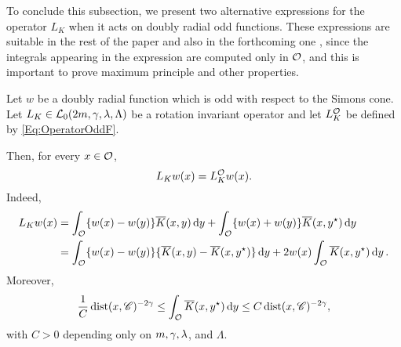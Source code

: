 To conclude this subsection, we present two alternative expressions for the operator $L_K$ when it acts on doubly radial odd functions. These expressions are suitable in the rest of the paper and also in the forthcoming one \cite{FelipeSanz-Perela:IntegroDifferentialII}, since the integrals appearing in the expression are computed only in $\mathcal{O}$, and this is important to prove maximum principle and other properties.

\begin{lemma}
	\label{Lemma:OperatorOddF}
	Let $w$ be a doubly radial function which is odd with respect to the Simons cone. Let $L_K \in \mathcal{L}_0(2m,\gamma,\lambda, \Lambda)$ be a rotation invariant operator and let $L_K^{\mathcal{O}}$ be defined by \eqref{Eq:OperatorOddF}. 
	
	Then, for every $x\in\mathcal{O}$,
	$$ 	L_K w (x) = L_K^{\mathcal{O}} w(x).   $$
	Indeed,
	\begin{align*}
	L_K w (x) &= \int_{\mathcal{O}} \{w(x) - w(y) \} \overline{K}(x, y) \,\mathrm{d} y +  \int_{\mathcal{O}} \{w(x) + w(y) \} \overline{K}(x, y^\star) \,\mathrm{d} y \\
	&= \int_{\mathcal{O}} \{w(x) - w(y) \} \{\overline{K}(x, y) - \overline{K}(x, y^\star)  \} \,\mathrm{d} y +  2 w(x) \int_{\mathcal{O}} \overline{K}(x, y^\star) \,\mathrm{d} y \,.
	\end{align*}
	Moreover,
	\begin{equation}
	\label{Eq:ZeroOrderTerm}
		\dfrac{1}{C} \operatorname{dist}(x,\mathscr{C})^{-2\gamma} \leq \int_{\mathcal{O}} \overline{K}(x, y^\star) \,\mathrm{d} y \leq C \operatorname{dist}(x,\mathscr{C})^{-2\gamma},
	\end{equation}
	with $C>0$ depending only on $m, \gamma, \lambda$, and $\Lambda$.
\end{lemma}

